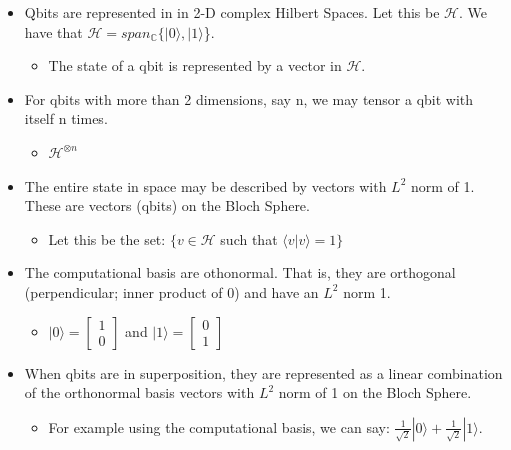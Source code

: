 \documentclass[letterpaper, 10 pt, conference]{ieeeconf}
\begin{document}
\begin{itemize}
   \item Qbits are represented in in 2-D complex Hilbert Spaces.  Let this be \( \mathscr{H} \).  We have that \( \mathscr{H} =  span_\mathbb{C} \{ {|0\rangle, |1\rangle } \)\}.
   \begin{itemize}
     \item The state of a qbit is represented by a vector in \( \mathscr{H} \).
   \end{itemize}
   \item For qbits with more than 2 dimensions, say n, we may tensor a qbit with itself n times.
   \begin{itemize}
     \item \( \mathscr{H}^{\otimes n} \)
   \end{itemize}
   \item The entire state in space may be described by vectors with \( L^2 \) norm of 1.  These are vectors (qbits) on the Bloch Sphere.
   \begin{itemize}
     \item Let this be the set: \( \{v \in \mathscr{H} \) such that \( \langle v|v\rangle = 1\} \)
   \end{itemize}
   \item The computational basis are othonormal.  That is, they are orthogonal (perpendicular; inner product of 0) and have an \( L^2 \) norm 1.
   \begin{itemize}
     \item \( |0\rangle = \begin{bmatrix} 1 \\ 0 \end{bmatrix} \) and \( |1\rangle = \begin{bmatrix} 0 \\ 1 \end{bmatrix} \)
   \end{itemize}
   \item When qbits are in superposition, they are represented as a linear combination of the orthonormal basis vectors with \( L^2 \) norm of 1 on the Bloch Sphere.
   \begin{itemize}
     \item For example using the computational basis, we can say: \( \frac{1}{\sqrt{2}}|0\rangle + \frac{1}{\sqrt{2}}|1\rangle \).\\
   \end{itemize}
\end{itemize}
\end{document}

